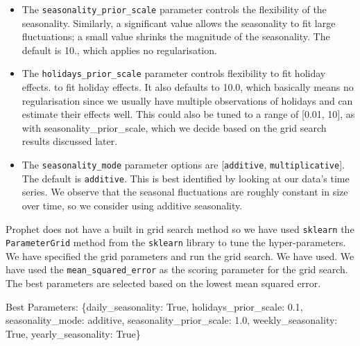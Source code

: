 \documentclass[mstat,12pt]{unswthesis}
\newenvironment{Shaded}{\begin{snugshade}}{\end{snugshade}}
\newcommand{\FloatTok}[1]{\textcolor[rgb]{0.00,0.00,0.81}{#1}}
\newcommand{\NormalTok}[1]{#1}
\newcommand{\StringTok}[1]{\textcolor[rgb]{0.31,0.60,0.02}{#1}}
\newcommand{\VariableTok}[1]{\textcolor[rgb]{0.00,0.00,0.00}{#1}}
\begin{document}
\begin{itemize}
\item
  The \texttt{seasonality\_prior\_scale} parameter controls the
  flexibility of the seasonality. Similarly, a significant value allows
  the seasonality to fit large fluctuations; a small value shrinks the
  magnitude of the seasonality. The default is 10., which applies no
  regularisation.
\item
  The \texttt{holidays\_prior\_scale} parameter controls flexibility to
  fit holiday effects. to fit holiday effects. It also defaults to 10.0,
  which basically means no regularisation since we usually have multiple
  observations of holidays and can estimate their effects well. This
  could also be tuned to a range of {[}0.01, 10{]}, as with
  seasonality\_prior\_scale, which we decide based on the grid search
  results discussed later.
\item
  The \texttt{seasonality\_mode} parameter options are
  {[}\texttt{\textquotesingle{}additive\textquotesingle{}},
  \texttt{\textquotesingle{}multiplicative\textquotesingle{}}{]}. The
  default is \texttt{\textquotesingle{}additive\textquotesingle{}}. This
  is best identified by looking at our data's time series. We observe
  that the seasonal fluctuations are roughly constant in size over time,
  so we consider using additive seasonality.
\end{itemize}

Prophet does not have a built in grid search method so we have used
\texttt{sklearn} the \texttt{ParameterGrid} method from the
\texttt{sklearn} library to tune the hyper-parameters. We have specified
the grid parameters and run the grid search. We have used. We have used
the \texttt{mean\_squared\_error} as the scoring parameter for the grid
search. The best parameters are selected based on the lowest mean
squared error.

\begin{Shaded}
\begin{Highlighting}[]
\NormalTok{Best Parameters: \{}\StringTok{\textquotesingle{}daily\_seasonality\textquotesingle{}}\NormalTok{: }\VariableTok{True}\NormalTok{, }
                  \StringTok{\textquotesingle{}holidays\_prior\_scale\textquotesingle{}}\NormalTok{: }\FloatTok{0.1}\NormalTok{, }
                  \StringTok{\textquotesingle{}seasonality\_mode\textquotesingle{}}\NormalTok{: }\StringTok{\textquotesingle{}additive\textquotesingle{}}\NormalTok{, }
                  \StringTok{\textquotesingle{}seasonality\_prior\_scale\textquotesingle{}}\NormalTok{: }\FloatTok{1.0}\NormalTok{, }
                  \StringTok{\textquotesingle{}weekly\_seasonality\textquotesingle{}}\NormalTok{: }\VariableTok{True}\NormalTok{, }
                  \StringTok{\textquotesingle{}yearly\_seasonality\textquotesingle{}}\NormalTok{: }\VariableTok{True}\NormalTok{\}}
\end{Highlighting}
\end{Shaded}
\end{document}
